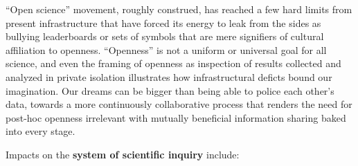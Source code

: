 \begin{itemize}
  ``Open science'' movement, roughly construed, has reached a few hard
  limits from present infrastructure that have forced its energy to leak
  from the sides as bullying leaderboards or sets of symbols that are
  mere signifiers of cultural affiliation to openness. ``Openness'' is
  not a uniform or universal goal for all science, and even the framing
  of openness as inspection of results collected and analyzed in private
  isolation illustrates how infrastructural deficts bound our
  imagination. Our dreams can be bigger than being able to police each
  other's data, towards a more continuously collaborative process that
  renders the need for post-hoc openness irrelevant with mutually
  beneficial information sharing baked into every stage.
\end{itemize}

Impacts on the \textbf{system of scientific inquiry} include:

